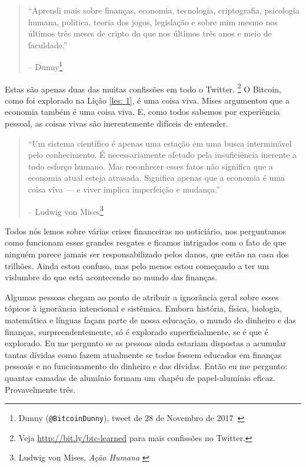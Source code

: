 \begin{quotation}\begin{samepage}
\enquote{Aprendi mais sobre finanças, economia, tecnologia, criptografia, psicologia humana, política, teoria dos jogos, legislação e sobre mim mesmo nos últimos três meses de cripto do que nos últimos três anos e meio de faculdade.}
\begin{flushright} -- Dunny\footnote{Dunny (\texttt{@BitcoinDunny}), tweet de 28 de Novembro de 2017~\cite{bitcoindunny-tweet}}
\end{flushright}\end{samepage}\end{quotation}

Estas são apenas duas das muitas confissões em todo o Twitter. \footnote{Veja \url{http://bit.ly/btc-learned} para mais confissões no Twitter.} O Bitcoin, como foi explorado na Lição \ref{les: 1}, é uma coisa viva. Mises argumentou que a economia também é uma coisa viva. E, como todos sabemos por experiência pessoal, as coisas vivas são inerentemente difíceis de entender.

\begin{quotation}\begin{samepage}
\enquote{Um sistema científico é apenas uma estação em uma busca interminável pelo conhecimento. É necessariamente afetado pela insuficiência inerente a todo esforço humano. Mas reconhecer esses fatos não significa que a economia atual esteja atrasada. Significa apenas que a economia é uma coisa viva --- e viver implica imperfeição e mudança.}
\begin{flushright} -- Ludwig von Mises\footnote{Ludwig von Mises, \textit{Ação Humana}
\cite{human-action}}
\end{flushright}\end{samepage}\end{quotation}

Todos nós lemos sobre várias crises financeiras no noticiário, nos perguntamos como funcionam esses grandes resgates e ficamos intrigados com o fato de que ninguém parece jamais ser responsabilizado pelos danos, que estão na casa dos trilhões. Ainda estou confuso, mas pelo menos estou começando a ter um vislumbre do que está acontecendo no mundo das finanças.

Algumas pessoas chegam ao ponto de atribuir a ignorância geral sobre esses tópicos à ignorância intencional e sistêmica. Embora história, física, biologia, matemática e línguas façam parte de nossa educação, o mundo do dinheiro e das finanças, surpreendentemente, só é explorado superficialmente, se é que é explorado. Eu me pergunto se as pessoas ainda estariam dispostas a acumular tantas dívidas como fazem atualmente se todos fossem educados em finanças pessoais e no funcionamento do dinheiro e das dívidas. Então eu me pergunto: quantas camadas de alumínio formam um chapéu de papel-alumínio eficaz. Provavelmente três.

